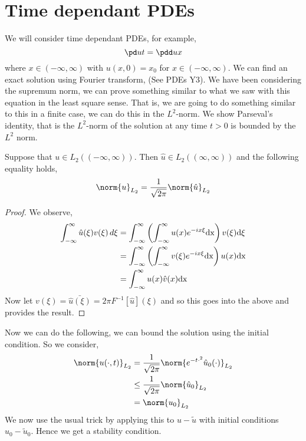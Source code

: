 
\section{Time dependant PDEs}
We will consider time dependant PDEs, for example,
$$ \pd u t = \pdd u x $$
where $x \in (-\infty, \infty)$ with $u(x, 0) = x_0$ for $x \in (-\infty, \infty)$. We can find an exact solution using Fourier transform, (See PDEs Y3). We have been considering the supremum norm, we can prove something similar to what we saw with this equation in the least square sense. That is, we are going to do something similar to this in a finite case, we can do this in the $L^2$-norm. We show Parseval's identity, that is the $L^2$-norm of the solution at any time $t > 0$ is bounded by the $L^2$ norm.
\begin{nlemma}
  Suppose that $u \in L_2((-\infty, \infty))$. Then $\hat u \in L_2((\infty, \infty))$ and the following equality holds,
  $$ \norm{u}_{L_2} = \frac{1}{\sqrt{2\pi}}\norm{\hat u}_{L_2} $$
\end{nlemma}
\begin{proof}
  We observe,
  \begin{align*}
    \int_{-\infty}^\infty \hat u(\xi)v(\xi) \,d\xi &= \int_{-\infty}^\infty \left( \int_{-\infty}^\infty u(x)e^{-ix\xi }\rm d x  \right) v(\xi)\rm d \xi \\
    &= \int_{-\infty}^\infty \left( \int_{-\infty}^\infty v(\xi)e^{-ix\xi} \rm dx\right) u(x) \rm dx\\
    &= \int_{-\infty}^\infty u(x)\hat v(x)\rm dx
  \end{align*}
  Now let $v(\xi) = \bar{\hat u(\xi)} = 2\pi F^{-1}[\hat u](\xi)$ and so this goes into the above and provides the result.
\end{proof}

\noindent
Now we can do the following, we can bound the solution using the initial condition. So we consider,
\begin{align*}
  \norm{u(\cdot, t)}_{L_2} &= \frac{1}{\sqrt{2\pi}}\norm{e^{-t \cdot ^2} \hat u_0 (\cdot)}_{L_2} \\
  &\le \frac{1}{\sqrt{2\pi}}\norm{\hat u_0}_{L_2} \\
  &= \norm{u_0}_{L_2}
\end{align*}
We now use the usual trick by applying this to $u - \tilde u$ with initial conditions $u_0 - \tilde u_0$. Hence we get a stability condition.

